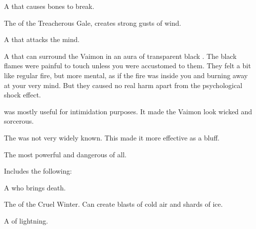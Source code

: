 \begin{subgloss}
  \begin{sephlist}
    \seph{\Djerzad}
    \index{\Djerzad}
    A \Qliphah{} that causes bones to break. 
    
    \seph{\Iphicoss}
    \index{\Iphicoss}
    The \Kliffah{} of the Treacherous Gale, creates strong gusts of wind. 
    
    \seph{\Kithvaz}
    \index{\Kithvaz}
    A \qliphah{} that attacks the mind. 
    
    \seph{\Shurreem}
    \index{\Shurreem}
    A \qliphah that can surround the Vaimon in an aura of transparent black . 
    The black flames were painful to touch unless you were accustomed to them. 
    They felt a bit like regular fire, but more mental, as if the fire was inside you and burning away at your very mind. 
    But they caused no real harm apart from the psychological shock effect. 
    
    \Shurreem was mostly useful for intimidation purposes. 
    It made the Vaimon look wicked and sorcerous. 
    
    The \qliphah was not very widely known. 
    This made it more effective as a bluff. 
  \end{sephlist}




  \begin{comment}
  \paragraph{Circle of Midnight}
  \end{comment}
  The most powerful and dangerous of all. 
  
  Includes the following: 
  
  \begin{sephlist}
    \seph{\Bozchul}
    \index{\Bozchul}
    A \qliphah{} who brings death. 
    
    \seph{\Horvaleth}
    \index{\Horvaleth}
    The \Kliffah{} of the Cruel Winter. 
    Can create blasts of cold air and shards of ice. 
    
    \seph{\Nyxachel}
    \index{\Nyxachel}
    A \Kliffah{} of lightning. 
  \end{sephlist}
\end{subgloss}









